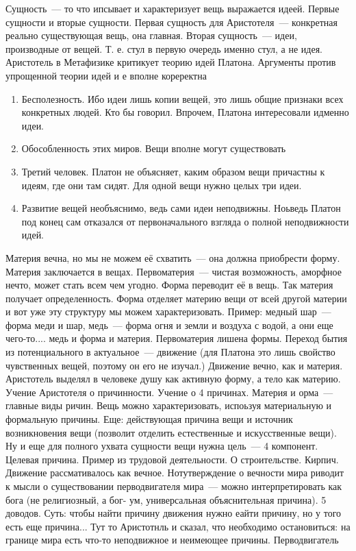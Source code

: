 Сущность~--- то что ипсывает и характеризует вещь выражается идеей. Первые сущности и вторые сущности. Первая сущность для Аристотеля~--- конкретная реально существующая вещь, она главная. Вторая сущность~--- идеи, производные от вещей. Т. е. стул в первую очередь именно стул, а не идея. Аристотель в Метафизике критикует теорию идей Платона. Аргументы против упрощенной теории идей и е вполне кореректна

\begin{enumerate}
	\item Бесполезность. Ибо идеи лишь копии вещей, это лишь общие признаки всех конкретных людей. Кто бы говорил. Впрочем, Платона интересовали идменно идеи. 
	\item Обособленность этих миров. Вещи вполне могут существовать
	\item Третий человек. Платон не объясняет, каким образом вещи причастны к идеям, где они там сидят. Для одной вещи нужно целых три идеи. 
	\item Развитие вещей необъяснимо, ведь сами идеи неподвижны. Ноьведь Платон под конец сам отказался от первоначального взгляда о полной неподвижности идей. 
\end{enumerate}

Материя вечна, но мы не можем её схватить~--- она должна приобрести форму. Материя заключается в вещах. Первоматерия~--- чистая возможность, аморфное нечто, может стать всем чем угодно. Форма переводит её в вещь. Так материя получает определенность. Форма отделяет материю вещи от всей другой материи и вот уже эту структуру мы можем характеризовать. Пример: медный шар~--- форма меди и шар, медь~--- форма огня и земли и воздуха с водой, а они еще чего-то.... медь и форма и материя. Первоматерия лишена формы. Переход бытия из потенциального в актуальное~--- движение (для Платона это лишь свойство чувственных вещей, поэтому он его не изучал.) Движение вечно, как и материя. 
Аристотель выделял в человеке душу как активную форму, а тело как материю. 
Учение Аристотеля о причинности. Учение о 4 причинах. Материя и орма~--- главные виды ричин. Вещь можно характеризовать, испоьзуя материальную и формальную причины. Еще: действующая причина вещи и источник возникновения вещи (позволит отделить естественные и искусственные вещи). Ну и еще для полного ухвата сущности вещи нужна цель~--- 4 компонент. Целевая причина. 
Пример из трудовой деятельности. О строительстве. Кирпич. 
Движение рассмативалось как вечное. Нотутверждение о вечности мира риводит к мысли о существовании перводвигателя мира~--- можно интерпретировать как бога (не религиозный, а бог- ум, универсальная объяснительная причина). 5 доводов. Суть: чтобы найти причину движения нужно еайти причину, но у того есть еще причина... Тут то Аристотнль и сказал, что необходимо остановиться: на границе мира есть что-то неподвижное и неимеющее причины. 
Перводвигатель

